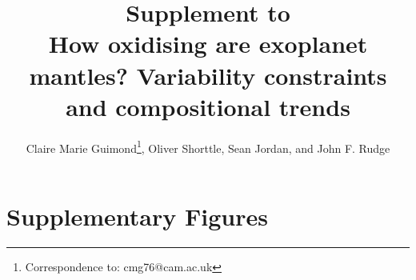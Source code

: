 \documentclass[times]{oupau}
\begin{document}
\renewcommand{\thefigure}{S\arabic{figure}}


\title{{\LARGE Supplement to}\\{\Large How oxidising are exoplanet mantles? Variability constraints and compositional trends}}

\author{Claire Marie Guimond\footnote{Correspondence to: cmg76@cam.ac.uk},
Oliver Shorttle, Sean Jordan, and  John F. Rudge}

\address{\emph{Department of Earth Sciences, University of Cambridge, Downing Street, Cambridge CB2 3EQ, UK}\\
\emph{Institute of Astronomy, University of Cambridge, Madingley Road, Cambridge CB3 0HA, UK}}




\maketitle

\section{Supplementary Figures}
\end{document}
